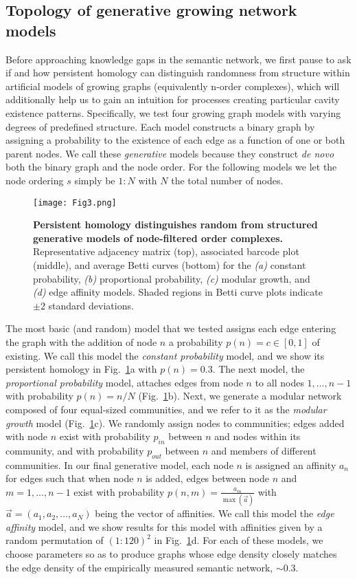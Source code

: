\documentclass{article}
\begin{document}
\subsection*{Topology of generative growing network models}

Before approaching knowledge gaps in the semantic network, we first pause to ask if and how persistent homology can distinguish randomness from structure within artificial models of growing graphs (equivalently n-order complexes), which will additionally help us to gain an intuition for processes creating particular cavity existence patterns. Specifically, we test four growing graph models with varying degrees of predefined structure. Each model constructs a binary graph by assigning a probability to the existence of each edge as a function of one or both parent nodes. We call these \emph{generative} models because they construct \textit{de novo} both the binary graph and the node order. For the following models we let the node ordering $s$ simply be $1:N$ with $N$ the total number of nodes.

\begin{figure}[h]
	\centering
	\texttt{[image: Fig3.png]}
	\caption{\textbf{Persistent homology distinguishes random from structured generative models of node-filtered order complexes.} Representative adjacency matrix (top), associated barcode plot (middle), and average Betti curves (bottom) for the \emph{(a)} constant probability, \emph{(b)} proportional probability, \emph{(c)} modular growth, and \emph{(d)} edge affinity models. Shaded regions in Betti curve plots indicate $\pm 2$ standard deviations.}
	\label{fig:3}
\end{figure}

The most basic (and random) model that we tested assigns each edge entering the graph with the addition of node $n$ a probability $p(n) = c \in [0,1]$ of existing. We call this model the \emph{constant probability} model, and we show its persistent homology in Fig.~\ref{fig:3}a with $p(n) = 0.3$. The next model, the \emph{proportional probability} model, attaches edges from node $n$ to all nodes $1, \dots, n-1$ with probability $p(n) = n/N$ (Fig.~\ref{fig:3}b). Next, we generate a modular network composed of four equal-sized communities, and we refer to it as the \emph{modular growth} model (Fig.~\ref{fig:3}c). We randomly assign nodes to communities; edges added with node $n$ exist with probability $p_{in}$ between $n$ and nodes within its community, and with probability $p_{out}$ between $n$ and members of different communities. In our final generative model, each node $n$ is assigned an affinity $a_n$ for edges such that when node $n$ is added, edges between node $n$ and $m = 1, \dots, n-1$ exist with probability $p(n,m) = \frac{a_m}{\max(\vec{a})}$ with $\vec{a} = (a_1, a_2, \dots, a_N)$ being the vector of affinities. We call this model the \emph{edge affinity} model, and we show results for this model with affinities given by a random permutation of $(1:120)^2$ in Fig.~\ref{fig:3}d. For each of these models, we choose parameters so as to produce graphs whose edge density closely matches the edge density of the empirically measured semantic network, $\sim 0.3$.
\end{document}
